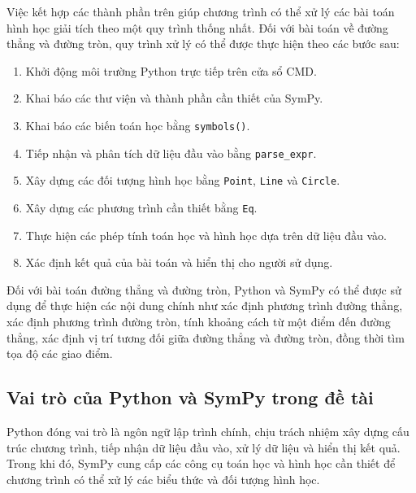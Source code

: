 \documentclass[12pt,a4paper]{article}
\begin{document}
Việc kết hợp các thành phần trên giúp chương trình có thể xử lý các bài toán hình học giải tích theo một quy trình thống nhất. Đối với bài toán về đường thẳng và đường tròn, quy trình xử lý có thể được thực hiện theo các bước sau:

\begin{enumerate}
    \item Khởi động môi trường Python trực tiếp trên cửa sổ CMD.
    
    \item Khai báo các thư viện và thành phần cần thiết của SymPy.
    
    \item Khai báo các biến toán học bằng \texttt{symbols()}.
    
    \item Tiếp nhận và phân tích dữ liệu đầu vào bằng \texttt{parse\_expr}.
    
    \item Xây dựng các đối tượng hình học bằng \texttt{Point}, \texttt{Line} và \texttt{Circle}.
    
    \item Xây dựng các phương trình cần thiết bằng \texttt{Eq}.
    
    \item Thực hiện các phép tính toán học và hình học dựa trên dữ liệu đầu vào.
    
    \item Xác định kết quả của bài toán và hiển thị cho người sử dụng.
\end{enumerate}

Đối với bài toán đường thẳng và đường tròn, Python và SymPy có thể được sử dụng để thực hiện các nội dung chính như xác định phương trình đường thẳng, xác định phương trình đường tròn, tính khoảng cách từ một điểm đến đường thẳng, xác định vị trí tương đối giữa đường thẳng và đường tròn, đồng thời tìm tọa độ các giao điểm.

\subsection{Vai trò của Python và SymPy trong đề tài}

Python đóng vai trò là ngôn ngữ lập trình chính, chịu trách nhiệm xây dựng cấu trúc chương trình, tiếp nhận dữ liệu đầu vào, xử lý dữ liệu và hiển thị kết quả. Trong khi đó, SymPy cung cấp các công cụ toán học và hình học cần thiết để chương trình có thể xử lý các biểu thức và đối tượng hình học.
\end{document}

